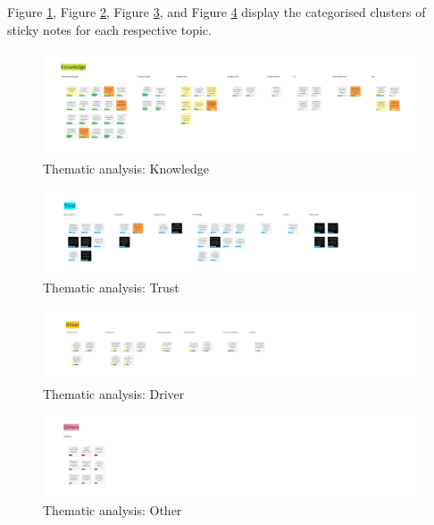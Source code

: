 Figure \ref{fig:thematic1}, Figure \ref{fig:thematic2}, Figure \ref{fig:thematic3}, and Figure \ref{fig:thematic4} display the categorised clusters of sticky notes for each respective topic.
\begin{figure}[h!]
  \centering
  \includegraphics[width=\textwidth]{Images/thematic1.pdf}
  \caption{Thematic analysis: Knowledge}
  \label{fig:thematic1}
\end{figure}
\begin{figure}[h!]
  \centering
  \includegraphics[width=\textwidth]{Images/thematic2.pdf}
  \caption{Thematic analysis: Trust}
  \label{fig:thematic2}
\end{figure}
\begin{figure}[h!]
  \centering
  \includegraphics[width=\textwidth]{Images/thematic3.pdf}
  \caption{Thematic analysis: Driver}
  \label{fig:thematic3}
\end{figure}
\begin{figure}[h!]
  \centering
  \includegraphics[width=\textwidth]{Images/thematic4.pdf}
  \caption{Thematic analysis: Other}
  \label{fig:thematic4}
\end{figure}


